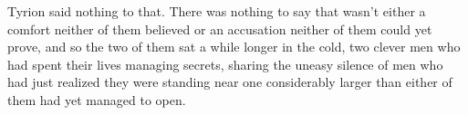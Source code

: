 Tyrion said nothing to that. There was nothing to say that wasn’t either a comfort neither of them believed or an accusation neither of them could yet prove, and so the two of them sat a while longer in the cold, two clever men who had spent their lives managing secrets, sharing the uneasy silence of men who had just realized they were standing near one considerably larger than either of them had yet managed to open.